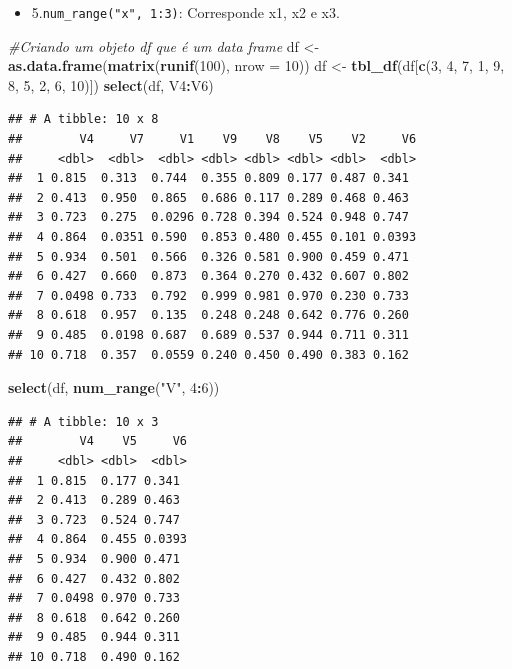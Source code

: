 \documentclass[a4paper]{book}
\newenvironment{Shaded}{\begin{snugshade}}{\end{snugshade}}
\newcommand{\CommentTok}[1]{\textcolor[rgb]{0.56,0.35,0.01}{\textit{#1}}}
\newcommand{\DataTypeTok}[1]{\textcolor[rgb]{0.13,0.29,0.53}{#1}}
\newcommand{\DecValTok}[1]{\textcolor[rgb]{0.00,0.00,0.81}{#1}}
\newcommand{\KeywordTok}[1]{\textcolor[rgb]{0.13,0.29,0.53}{\textbf{#1}}}
\newcommand{\NormalTok}[1]{#1}
\newcommand{\OperatorTok}[1]{\textcolor[rgb]{0.81,0.36,0.00}{\textbf{#1}}}
\newcommand{\StringTok}[1]{\textcolor[rgb]{0.31,0.60,0.02}{#1}}
\providecommand{\tightlist}{%
  \setlength{\itemsep}{0pt}\setlength{\parskip}{0pt}}
\begin{document}
\begin{itemize}
\tightlist
\item
  5.\texttt{num\_range("x",\ 1:3)}: Corresponde x1, x2 e x3.
\end{itemize}

\begin{Shaded}
\begin{Highlighting}[]
\CommentTok{#Criando um objeto df que é um data frame}
\NormalTok{df <-}\StringTok{ }\KeywordTok{as.data.frame}\NormalTok{(}\KeywordTok{matrix}\NormalTok{(}\KeywordTok{runif}\NormalTok{(}\DecValTok{100}\NormalTok{), }\DataTypeTok{nrow =} \DecValTok{10}\NormalTok{)) }
\NormalTok{df <-}\StringTok{ }\KeywordTok{tbl_df}\NormalTok{(df[}\KeywordTok{c}\NormalTok{(}\DecValTok{3}\NormalTok{, }\DecValTok{4}\NormalTok{, }\DecValTok{7}\NormalTok{, }\DecValTok{1}\NormalTok{, }\DecValTok{9}\NormalTok{, }\DecValTok{8}\NormalTok{, }\DecValTok{5}\NormalTok{, }\DecValTok{2}\NormalTok{, }\DecValTok{6}\NormalTok{, }\DecValTok{10}\NormalTok{)])}
\KeywordTok{select}\NormalTok{(df, V4}\OperatorTok{:}\NormalTok{V6)}
\end{Highlighting}
\end{Shaded}

\begin{verbatim}
## # A tibble: 10 x 8
##        V4     V7     V1    V9    V8    V5    V2     V6
##     <dbl>  <dbl>  <dbl> <dbl> <dbl> <dbl> <dbl>  <dbl>
##  1 0.815  0.313  0.744  0.355 0.809 0.177 0.487 0.341 
##  2 0.413  0.950  0.865  0.686 0.117 0.289 0.468 0.463 
##  3 0.723  0.275  0.0296 0.728 0.394 0.524 0.948 0.747 
##  4 0.864  0.0351 0.590  0.853 0.480 0.455 0.101 0.0393
##  5 0.934  0.501  0.566  0.326 0.581 0.900 0.459 0.471 
##  6 0.427  0.660  0.873  0.364 0.270 0.432 0.607 0.802 
##  7 0.0498 0.733  0.792  0.999 0.981 0.970 0.230 0.733 
##  8 0.618  0.957  0.135  0.248 0.248 0.642 0.776 0.260 
##  9 0.485  0.0198 0.687  0.689 0.537 0.944 0.711 0.311 
## 10 0.718  0.357  0.0559 0.240 0.450 0.490 0.383 0.162
\end{verbatim}

\begin{Shaded}
\begin{Highlighting}[]
\KeywordTok{select}\NormalTok{(df, }\KeywordTok{num_range}\NormalTok{(}\StringTok{"V"}\NormalTok{, }\DecValTok{4}\OperatorTok{:}\DecValTok{6}\NormalTok{))}
\end{Highlighting}
\end{Shaded}

\begin{verbatim}
## # A tibble: 10 x 3
##        V4    V5     V6
##     <dbl> <dbl>  <dbl>
##  1 0.815  0.177 0.341 
##  2 0.413  0.289 0.463 
##  3 0.723  0.524 0.747 
##  4 0.864  0.455 0.0393
##  5 0.934  0.900 0.471 
##  6 0.427  0.432 0.802 
##  7 0.0498 0.970 0.733 
##  8 0.618  0.642 0.260 
##  9 0.485  0.944 0.311 
## 10 0.718  0.490 0.162
\end{verbatim}
\end{document}
